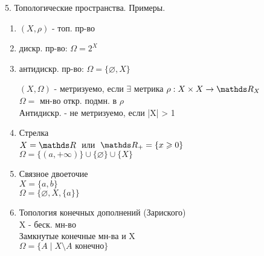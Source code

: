 \documentclass[11pt, fleqn]{article}
\begin{document}
\begin{question}{5. Топологические пространства. Примеры.}
        \begin{examples} 
            \begin{enumerate}
                \item $(X, \rho)$ - топ. пр-во
                \item дискр. пр-во: $\Omega = 2^X$
                \item антидискр. пр-во: $\Omega = \{\varnothing, X\}$
        
            \begin{definition} 
                $(X, \Omega)$ - метризуемо, если $\exists$ метрика $\rho: X \times X \rightarrow \R_X$\\
                $\Omega = $ мн-во откр. подмн. в $\rho$\\
                Антидискр. - не метризуемо, если |X| > 1
            \end{definition}
                \item Стрелка\\
                      $X = \R  \;$ или $\;  \R_+ = \{x \geq 0\}$\\
                      $\Omega = \{(a, +\infty)\} \cup \{\varnothing\} \cup \{X\}$
                \item Связное двоеточие\\
                      $X = \{a, b\}$\\
                      $\Omega = \{\varnothing, X, \{a\}\}$
                \item Топология конечных дополнений (Зариского)\\
                      X - беск. мн-во\\
                      Замкнутые конечные мн-ва и X \\
                      $\Omega = \{A \; | \; X \setminus A \text{ конечно}\}$
            \end{enumerate}
        \end{examples}
    \end{question}
\end{document}
